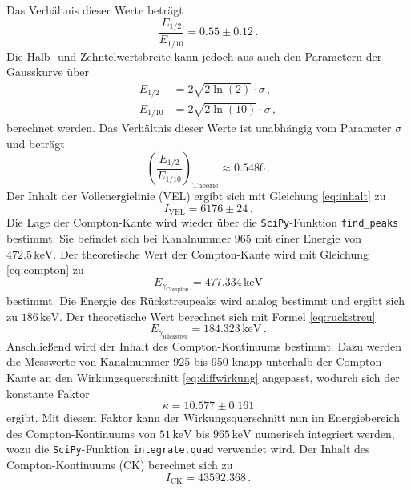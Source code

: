 Das Verhältnis dieser Werte beträgt
\begin{equation}
    \frac{E_{1/2}}{E_{1/10}} = 0.55 \pm 0.12 \, .
\end{equation}
Die Halb- und Zehntelwertsbreite kann jedoch aus auch den Parametern der Gausskurve über 
\begin{align}
    E_{1/2}  &= 2 \sqrt{2 \ln (2)} \cdot \sigma \, , \\
    E_{1/10} &= 2 \sqrt{2 \ln (10)} \cdot \sigma \, ,
\end{align}
berechnet werden. Das Verhältnis dieser Werte ist unabhängig vom Parameter $\sigma$
und beträgt
\begin{equation}
    \left(\frac{E_{1/2}}{E_{1/10}}\right)_\text{Theorie} \approx 0.5486 \, .
\end{equation}
Der Inhalt der Vollenergielinie (VEL) ergibt sich mit Gleichung \eqref{eq:inhalt} zu
\begin{equation}
    I_\text{VEL} = 6176 \pm 24 \, .
\end{equation}
Die Lage der Compton-Kante wird wieder über die \texttt{SciPy}-Funktion \texttt{find\_peaks} bestimmt. 
Sie befindet sich bei Kanalnummer 965 mit einer Energie von $472.5 \, \text{keV}$.
Der theoretische Wert der Compton-Kante wird mit Gleichung \eqref{eq:compton} zu
\begin{equation}
    E_{\gamma_\text{Compton}} = 477.334 \, \text{keV} 
\end{equation}
bestimmt.
Die Energie des Rückstreupeaks wird analog bestimmt und ergibt sich zu $186 \, \text{keV}$.
Der theoretische Wert berechnet sich mit Formel \eqref{eq:ruckstreu}
\begin{equation}
    E_{\gamma_\text{Rückstreu}} = 184.323 \, \text{keV} \, .
\end{equation}
Anschließend wird der Inhalt des Compton-Kontinuums bestimmt.
Dazu werden die Messwerte von Kanalnummer 925 bis 950 knapp unterhalb der Compton-Kante 
an den Wirkungsquerschnitt \eqref{eq:diffwirkung} angepasst, wodurch sich der konstante Faktor
\begin{equation}
    \kappa = 10.577 ± 0.161
\end{equation}
ergibt. Mit diesem Faktor kann der Wirkungsquerschnitt nun im Energiebereich des Compton-Kontinuums
von $51\, \text{keV}$ bis $965 \, \text{keV}$ 
numerisch integriert werden, wozu die \texttt{SciPy}-Funktion \texttt{integrate.quad} verwendet wird.
Der Inhalt des Compton-Kontinuums (CK) berechnet sich zu 
\begin{equation}
    I_\text{CK}  = 43592.368 \, .
\end{equation}
